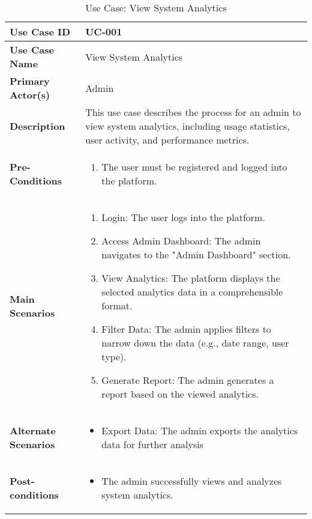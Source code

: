 \begin{table}[!ht]
    \centering
    \renewcommand{\arraystretch}{1.3} %
    \begin{tabularx}{\textwidth}{|l|X|}
        \hline
        \textbf{Use Case ID} & UC-001 \\
        \hline
        \textbf{Use Case Name} & View System Analytics \\
        \hline
        \textbf{Primary Actor(s)} & Admin \\
        \hline
        \textbf{Description} &  This use case describes the process for an admin to view system analytics, including usage statistics, user activity, and performance metrics.\\
        \hline
        \textbf{Pre-Conditions} & 
        \begin{enumerate}[label=\arabic*.,itemsep=0pt]
            \item The user must be registered and logged into the platform.
        \end{enumerate} \\
        \hline
        \textbf{Main Scenarios} & 
        \begin{enumerate}[label=\arabic*.,itemsep=0pt]
            \item Login: The user logs into the platform.
            \item Access Admin Dashboard: The admin navigates to the "Admin Dashboard" section.
            \item View Analytics: The platform displays the selected analytics data in a comprehensible format.
            \item Filter Data: The admin applies filters to narrow down the data (e.g., date range, user type).
            \item Generate Report: The admin generates a report based on the viewed analytics.
        \end{enumerate} \\
        
        \hline
        \textbf{Alternate Scenarios} & 
        \begin{itemize}[label=--,itemsep=0pt]
            \item Export Data: The admin exports the analytics data for further analysis
        \end{itemize} \\
        \hline
        \textbf{Post-conditions} & 
        \begin{itemize}[label=--,itemsep=0pt]
            \item The admin successfully views and analyzes system analytics.
        \end{itemize} \\
        \hline
    \end{tabularx}
    \caption{Use Case: View System Analytics}
    \label{tab:use-case-register}
\end{table}


